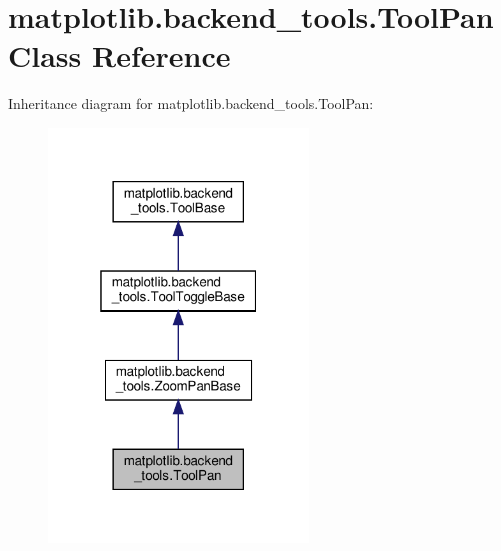 \hypertarget{classmatplotlib_1_1backend__tools_1_1ToolPan}{}\section{matplotlib.\+backend\+\_\+tools.\+Tool\+Pan Class Reference}
\label{classmatplotlib_1_1backend__tools_1_1ToolPan}


Inheritance diagram for matplotlib.\+backend\+\_\+tools.\+Tool\+Pan\+:
\nopagebreak
\begin{figure}[H]
\begin{center}
\leavevmode
\includegraphics[width=196pt]{classmatplotlib_1_1backend__tools_1_1ToolPan__inherit__graph}
\end{center}
\end{figure}


